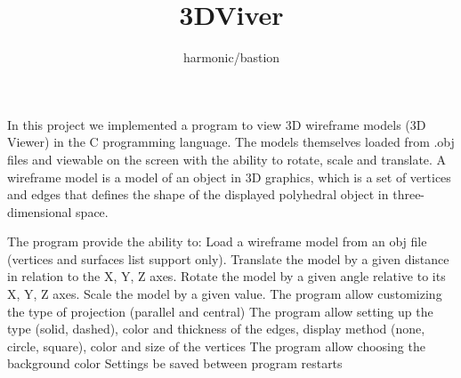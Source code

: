 \documentclass{article}
\title{3DViver}
\author{harmonic/bastion}
\begin{document}
\maketitle
In this project we implemented a program to view 3D wireframe models (3D Viewer) in the C programming language. 
The models themselves loaded from .obj files and viewable on the screen with the ability to rotate, 
scale and translate.
A wireframe model is a model of an object in 3D graphics, 
which is a set of vertices and edges that defines the shape of the displayed polyhedral object in 
three-dimensional space.

The program provide the ability to:
Load a wireframe model from an obj file (vertices and surfaces list support only).
Translate the model by a given distance in relation to the X, Y, Z axes.
Rotate the model by a given angle relative to its X, Y, Z axes.
Scale the model by a given value.
The program  allow customizing the type of projection (parallel and central)
The program allow setting up the type (solid, dashed), color and thickness of the edges,
 display method (none, circle, square), color and size of the vertices
The program  allow choosing the background color
Settings be saved between program restarts
\end{document}
